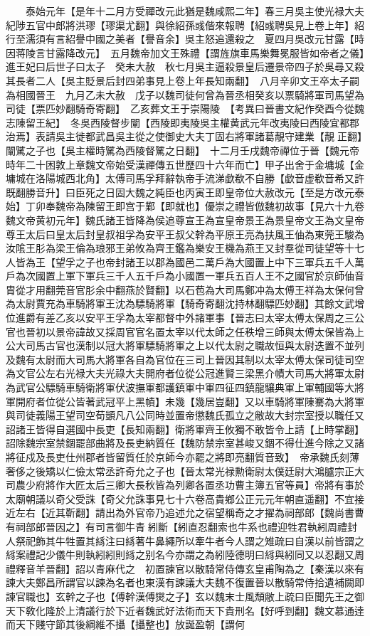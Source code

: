 　　泰始元年【是年十二月方受禪改元此猶是魏咸熙二年】春三月吳主使光禄大夫紀陟五官中郎將洪璆【璆渠尤翻】與徐紹孫彧偕來報聘【紹彧聘吳見上卷上年】紹行至濡須有言紹譽中國之美者【譽音余】吳主怒追還殺之　夏四月吳改元甘露【時因蒋陵言甘露降改元】　五月魏帝加文王殊禮【謂旌旗車馬樂舞冕服皆如帝者之儀】進王妃曰后世子曰太子　癸未大赦　秋七月吳主逼殺景皇后遷景帝四子於吳尋又殺其長者二人【吳主貶景后封四弟事見上卷上年長知兩翻】　八月辛卯文王卒太子嗣為相國晉王　九月乙未大赦　戊子以魏司徒何曾為晉丞相癸亥以票騎將軍司馬望為司徒【票匹妙翻騎奇寄翻】　乙亥葬文王于崇陽陵　【考異曰晉書文紀作癸酉今從魏志陳留王紀】　冬吳西陵督步闡【西陵即夷陵吳主權黄武元年改夷陵曰西陵宜都郡治焉】表請吳主徙都武昌吳主從之使御史大夫丁固右將軍諸葛靚守建業【靚正翻】闡騭之子也【吳主權時騭為西陵督騭之日翻】　十二月壬戌魏帝禪位于晉【魏元帝時年二十困敦上章魏文帝始受漢禪傳五世歷四十六年而亡】甲子出舍于金墉城【金墉城在洛陽城西北角】太傅司馬孚拜辭執帝手流涕歔欷不自勝【歔音虚欷音希又許既翻勝音升】曰臣死之日固大魏之純臣也丙寅王即皇帝位大赦改元【至是方改元泰始】丁卯奉魏帝為陳留王即宫于鄴【即就也】優崇之禮皆倣魏初故事【見六十九卷魏文帝黄初元年】魏氏諸王皆降為侯追尊宣王為宣皇帝景王為景皇帝文王為文皇帝尊王太后曰皇太后封皇叔祖孚為安平王叔父幹為平原王亮為扶風王伷為東莞王駿為汝隂王肜為梁王倫為琅邪王弟攸為齊王鑑為樂安王機為燕王又封羣從司徒望等十七人皆為王【望孚之子也帝封諸王以郡為國邑二萬戶為大國置上中下三軍兵五千人萬戶為次國置上軍下軍兵三千人五千戶為小國置一軍兵五百人王不之國官於京師伷音胄從才用翻莞音官肜余中翻燕於賢翻】以石苞為大司馬鄭冲為太傅王祥為太保何曾為太尉賈充為車騎將軍王沈為驃騎將軍【騎奇寄翻沈持林翻驃匹妙翻】其餘文武增位進爵有差乙亥以安平王孚為太宰都督中外諸軍事【晉志曰太宰太傅太保周之三公官也晉初以景帝諱故又採周官官名置太宰以代太師之任秩增三師與太傅太保皆為上公大司馬古官也漢制以冠大將軍驃騎將軍之上以代太尉之職故恒與太尉迭置不並列及魏有太尉而大司馬大將軍各自為官位在三司上晉因其制以太宰太傅太保司徒司空為文官公左右光禄大夫光祿大夫開府者位從公冠進賢三梁黑介幘大司馬大將軍太尉為武官公驃騎車騎衛將軍伏波撫軍都護鎮軍中軍四征四鎮龍驤典軍上軍輔國等大將軍開府者位從公皆著武冠平上黑幘】未幾【幾居豈翻】又以車騎將軍陳騫為大將軍與司徒義陽王望司空荀顗凡八公同時並置帝懲魏氏孤立之敝故大封宗室授以職任又詔諸王皆得自選國中長吏【長知兩翻】衛將軍齊王攸獨不敢皆令上請【上時掌翻】　詔除魏宗室禁錮罷部曲將及長吏納質任【魏防禁宗室甚峻又錮不得仕進今除之又諸將征戍及長吏仕州郡者皆留質任於京師今亦罷之將即亮翻質音致】　帝承魏氏刻薄奢侈之後矯以仁儉太常丞許奇允之子也【晉太常光禄勲衛尉太僕廷尉大鴻臚宗正大司農少府將作大匠太后三卿大長秋皆為列卿各置丞功曹主簿五官等員】帝將有事於太廟朝議以奇父受誅【奇父允誅事見七十六卷高貴鄉公正元元年朝直遥翻】不宜接近左右【近其靳翻】請出為外官帝乃追述允之宿望稱奇之才擢為祠部郎【魏尚書曹有祠部郎晉因之】有司言御牛青紖斷【紖直忍翻索也牛系也禮迎牲君執紖周禮封人祭祀飾其牛牲置其絼注曰絼著牛鼻繩所以牽牛者今人謂之雉疏曰自漢以前皆謂之絼案禮記少儀牛則執紖紖則絼之别名今亦謂之為紖陸德明曰絼與紖同又以忍翻又周禮釋音羊晉翻】詔以青麻代之　初置諫官以散騎常侍傳玄皇甫陶為之【秦漢以來有諫大夫鄭昌所謂官以諫為名者也東漢有諫議大夫魏不復置晉以散騎常侍拾遺補闕即諫官職也】玄幹之子也【傅幹漢傅爕之子】玄以魏末士風頹敝上疏曰臣聞先王之御天下敎化隆於上清議行於下近者魏武好法術而天下貴刑名【好呼到翻】魏文慕通逹而天下賤守節其後綱維不攝【攝整也】放誕盈朝【謂何